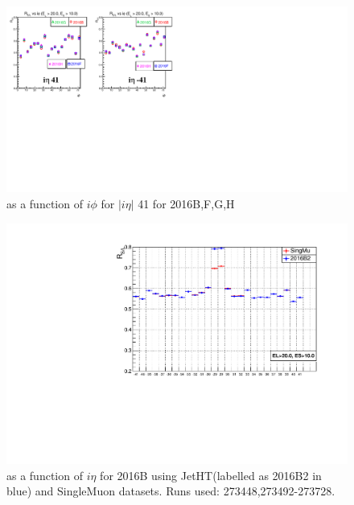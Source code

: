 \begin{figure}[h!]
\centering
\includegraphics[width=0.99\linewidth]{../Figures/Chap2/ImageFiles_HF/Ratio/2016/RvsIphi2016BFGH/ieta41_E1E2Cut0Ietaiphi}
\caption{\ratiosl as a function of $i\phi$ for $|i\eta|$ 41 for 2016B,F,G,H}
\label{fig:ieta41_E1E2Cut0Ietaiphi2016BFGH}
\end{figure}

\begin{figure}[h!]
\centering
\includegraphics[width=0.99\linewidth]{../Figures/Chap2/ImageFiles_HF/Ratio/2016/2016B2SingMu}
\caption{\ratiosl as a function of $i\eta$ for 2016B using JetHT(labelled as 2016B2 in blue) and SingleMuon datasets. Runs used:
273448,273492-273728.}
\label{fig:2016B2SingMu}
\end{figure}

